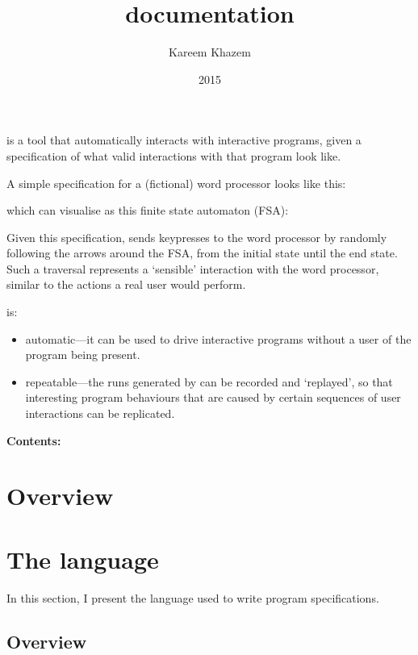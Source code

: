 \documentclass[11pt,a4paper]{article}
\begin{document}
\title{ documentation}
\date{2015}
\author{Kareem Khazem}

\maketitle

 is a tool that automatically interacts with interactive
programs, given a specification of what valid interactions with
that program look like.

A simple specification for a (fictional) word processor looks like
this:


which  can visualise as this finite state automaton
(FSA):


Given this specification,  sends keypresses to the word
processor by randomly following the arrows around the FSA, from the
initial state until the end state. Such a traversal represents a
`sensible' interaction with the word processor, similar to the actions
a real user would perform.

 is:

\begin{itemize}

  \item automatic---it can be used to drive interactive programs
    without a user of the program being present.

  \item repeatable---the runs generated by  can be
    recorded and `replayed', so that interesting program behaviours
    that are caused by certain sequences of user interactions can be
    replicated.

  \end{itemize}

\textbf{\large{Contents:}}

\section{Overview}

\section{The  language}

In this section, I present the language used to write program
specifications.

\subsection{Overview}
\end{document}
